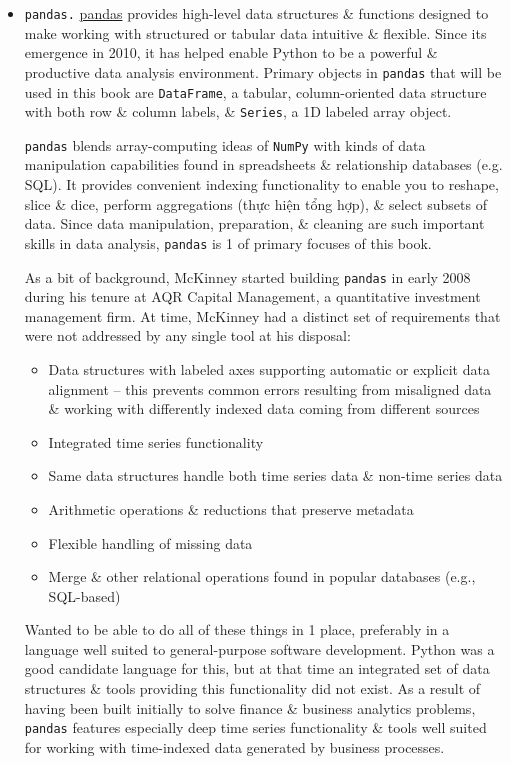\documentclass{article}
\begin{document}
\begin{enumerate}
\begin{itemize}
\begin{itemize}
\begin{itemize}
				\item {\tt pandas.} \href{https://pandas.pydata.org}{pandas} provides high-level data structures \& functions designed to make working with structured or tabular data intuitive \& flexible. Since its emergence in 2010, it has helped enable Python to be a powerful \& productive data analysis environment. Primary objects in {\tt pandas} that will be used in this book are {\tt DataFrame}, a tabular, column-oriented data structure with both row \& column labels, \& {\tt Series}, a 1D labeled array object.
				
				{\tt pandas} blends array-computing ideas of {\tt NumPy} with kinds of data manipulation capabilities found in spreadsheets \& relationship databases (e.g. SQL). It provides convenient indexing functionality to enable you to reshape, slice \& dice, perform aggregations (thực hiện tổng hợp), \& select subsets of data. Since data manipulation, preparation, \& cleaning are such important skills in data analysis, {\tt pandas} is 1 of primary focuses of this book.
				
				As a bit of background, {\sc McKinney} started building {\tt pandas} in early 2008 during his tenure at AQR Capital Management, a quantitative investment management firm. At time, {\sc McKinney} had a distinct set of requirements that were not addressed by any single tool at his disposal:
				\begin{itemize}
					\item Data structures with labeled axes supporting automatic or explicit data alignment -- this prevents common errors resulting from misaligned data \& working with differently indexed data coming from different sources
					\item Integrated time series functionality
					\item Same data structures handle both time series data \& non-time series data
					\item Arithmetic operations \& reductions that preserve metadata
					\item Flexible handling of missing data
					\item Merge \& other relational operations found in popular databases (e.g., SQL-based)
				\end{itemize}
				Wanted to be able to do all of these things in 1 place, preferably in a language well suited to general-purpose software development. Python was a good candidate language for this, but at that time an integrated set of data structures \& tools providing this functionality did not exist. As a result of having been built initially to solve finance \& business analytics problems, {\tt pandas} features especially deep time series functionality \& tools well suited for working with time-indexed data generated by business processes.
				

\end{itemize}
\end{itemize}
\end{itemize}
\end{enumerate}
\end{document}
